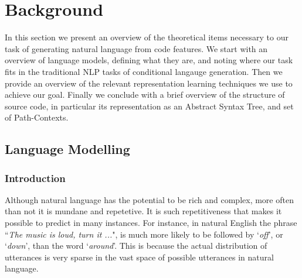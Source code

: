 \chapter{Background}
\label{background}

In this section we present an overview of the theoretical items necessary to our task of generating natural language from code features.
We start with an overview of language models, defining what they are, and noting where our task fits in the traditional NLP tasks of conditional langauge generation.
Then we provide an overview of the relevant representation learning techniques we use to achieve our goal.
Finally we conclude with a brief overview of the structure of source code, in particular its representation as an Abstract Syntax Tree, and set of Path-Contexts. 


\section{Language Modelling} %
\label{sec:lstm}

\subsection{Introduction} %
\label{sub:recurrent_neural_networks}

Although natural language has the potential to be rich and complex, more often than not it is mundane and repetetive. \citep{c._e._shannon_prediction_1951} 
It is such repetitiveness that makes it possible to predict in many instances. For instance, in natural English the phrase ``\textit{The music is loud, turn it ...}", is much more likely to be followed by `\textit{off}', or `\textit{down}', than the word `\textit{around}'.
This is because the actual distribution of utterances is very sparse in  the vast space of possible utterances in natural language.

